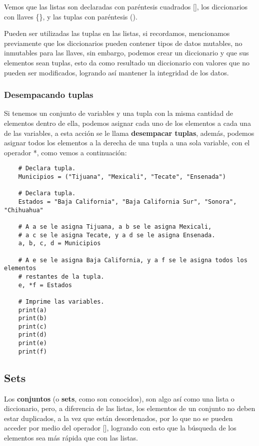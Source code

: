 Vemos que las listas son declaradas con paréntesis cuadrados [], los diccionarios con llaves \{\}, y las tuplas con paréntesis ().

Pueden ser utilizadas las tuplas en las listas, si recordamos, mencionamos previamente que los diccionarios pueden contener tipos de datos mutables, no inmutables para las llaves, sin embargo, podemos crear un diccionario y que sus elementos sean tuplas, esto da como resultado un diccionario con valores que no pueden ser modificados, logrando así mantener la integridad de los datos.


\subsubsection{Desempacando tuplas}

Si tenemos un conjunto de variables y una tupla con la misma cantidad de elementos dentro de ella, podemos asignar cada uno de los elementos a cada una de las variables, a esta acción se le llama \textbf{desempacar tuplas}, además, podemos asignar todos los elementos a la derecha de una tupla a una sola variable, con el operador *, como vemos a continuación:
\begin{lstlisting}
    # Declara tupla.
    Municipios = ("Tijuana", "Mexicali", "Tecate", "Ensenada")

    # Declara tupla.
    Estados = "Baja California", "Baja California Sur", "Sonora", "Chihuahua"

    # A a se le asigna Tijuana, a b se le asigna Mexicali,
    # a c se le asigna Tecate, y a d se le asigna Ensenada.
    a, b, c, d = Municipios

    # A e se le asigna Baja California, y a f se le asigna todos los elementos
    # restantes de la tupla.   
    e, *f = Estados   

    # Imprime las variables.
    print(a)
    print(b)
    print(c)
    print(d)
    print(e)
    print(f)
\end{lstlisting}


\subsection{Sets}

Los \textbf{conjuntos} (o \textbf{sets}, como son conocidos), son algo así como una lista o diccionario, pero, a diferencia de las listas, los elementos de un conjunto no deben estar duplicados, a la vez que están desordenados, por lo que no se pueden acceder por medio del operador [], logrando con esto que la búsqueda de los elementos sea más rápida que con las listas.

